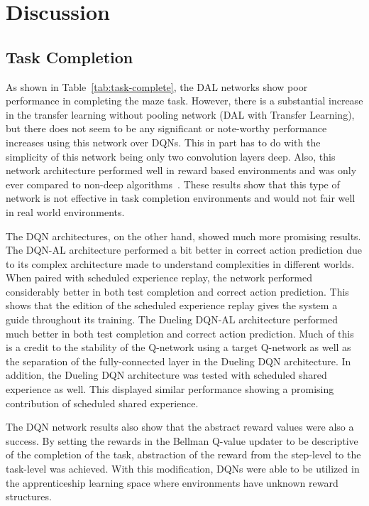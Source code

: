 \documentclass[12pt,american]{report}
\begin{document}
\section{Discussion}

\subsection{Task Completion}
As shown in Table~\ref{tab:task-complete}, the DAL networks show poor performance in completing the maze task.  However, there is a substantial increase in the transfer learning without pooling network (DAL with Transfer Learning), but there does not seem to be any significant or note-worthy performance increases using this network over DQNs.  This in part has to do with the simplicity of this network being only two convolution layers deep.  Also, this network architecture performed well in reward based environments and was only ever compared to non-deep algorithms~\cite{markovikj2014deep}.  These results show that this type of network is not effective in task completion environments and would not fair well in real world environments.  

The DQN architectures, on the other hand, showed much more promising results. The DQN-AL architecture performed a bit better in correct action prediction due to its complex architecture made to understand complexities in different worlds. When paired with scheduled experience replay, the network performed considerably better in both test completion and correct action prediction.  This shows that the edition of the scheduled experience replay gives the system a guide throughout its training.  The Dueling DQN-AL architecture performed much better in both test completion and correct action prediction.  Much of this is a credit to the stability of the Q-network using a target Q-network as well as the separation of the fully-connected layer in the Dueling DQN architecture.  In addition, the Dueling DQN architecture was tested with scheduled shared experience as well.  This displayed similar performance showing a promising contribution of scheduled shared experience. 

The DQN network results also show that the abstract reward values were also a success. By setting the rewards in the Bellman Q-value updater to be descriptive of the completion of the task, abstraction of the reward from the step-level to the task-level was achieved.  With this modification, DQNs were able to be utilized in the apprenticeship learning space where environments have unknown reward structures. 
\end{document}
